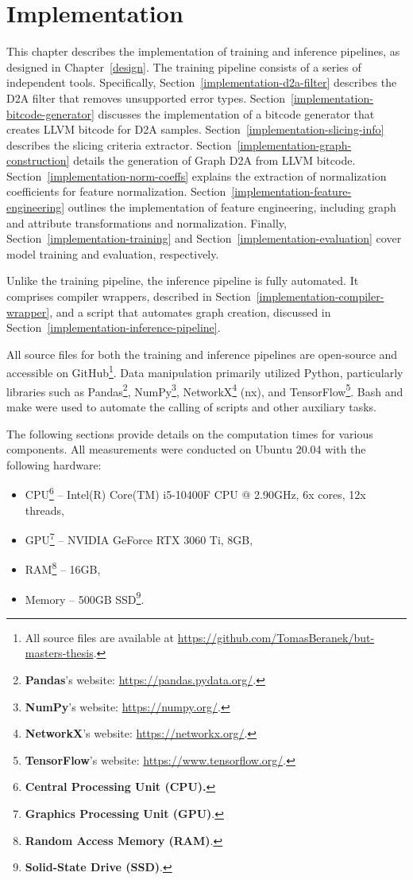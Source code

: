 \chapter{Implementation}
\label{implementation}
This chapter describes the implementation of training and inference pipelines, as designed in Chapter~\ref{design}. The training pipeline consists of a series of independent tools. Specifically, Section~\ref{implementation-d2a-filter} describes the D2A filter that removes unsupported error types. Section~\ref{implementation-bitcode-generator} discusses the implementation of a bitcode generator that creates LLVM bitcode for D2A samples. Section~\ref{implementation-slicing-info} describes the slicing criteria extractor. Section~\ref{implementation-graph-construction} details the generation of Graph D2A from LLVM bitcode. Section~\ref{implementation-norm-coeffs} explains the extraction of normalization coefficients for feature normalization. Section~\ref{implementation-feature-engineering} outlines the implementation of feature engineering, including graph and attribute transformations and normalization. Finally, Section~\ref{implementation-training} and Section~\ref{implementation-evaluation} cover model training and evaluation, respectively.

Unlike the training pipeline, the inference pipeline is fully automated. It comprises compiler wrappers, described in Section~\ref{implementation-compiler-wrapper}, and a script that automates graph creation, discussed in Section~\ref{implementation-inference-pipeline}.

All source files for both the training and inference pipelines are open-source and accessible on GitHub\footnote{All source files are available at \url{https://github.com/TomasBeranek/but-masters-thesis}.}. Data manipulation primarily utilized Python, particularly libraries such as Pandas\footnote{\textbf{Pandas}'s website: \url{https://pandas.pydata.org/}.}, NumPy\footnote{\textbf{NumPy}'s website: \url{https://numpy.org/}.}, NetworkX\footnote{\textbf{NetworkX}'s website: \url{https://networkx.org/}.} (nx), and TensorFlow\footnote{\textbf{TensorFlow}'s website: \url{https://www.tensorflow.org/}.}. Bash and make were used to automate the calling of scripts and other auxiliary tasks.

The following sections provide details on the computation times for various components. All measurements were conducted on Ubuntu 20.04 with the following hardware:
\begin{itemize}
    \item CPU\footnote{\textbf{Central Processing Unit (CPU).}} -- Intel(R) Core(TM) i5-10400F CPU @ 2.90GHz, 6x cores, 12x threads,
    \item GPU\footnote{\textbf{Graphics Processing Unit (GPU)}.} -- NVIDIA GeForce RTX 3060 Ti, 8GB,
    \item RAM\footnote{\textbf{Random Access Memory (RAM)}.} -- 16GB,
    \item Memory -- 500GB SSD\footnote{\textbf{Solid-State Drive (SSD)}.}.
\end{itemize}


